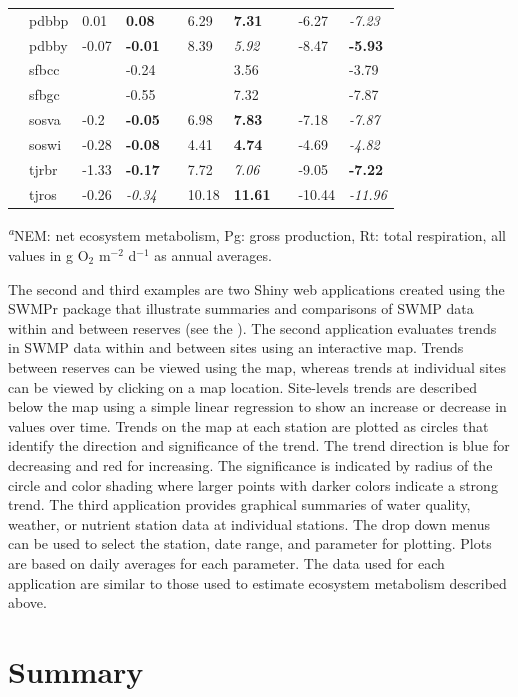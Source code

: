 \documentclass[10pt,letterpaper]{article}\usepackage[]{graphicx}\usepackage[]{color}
\begin{document}
\begin{table}[!tbp]
{\begin{center}
\begin{tabular}{lllcllcll}
~~pdbbp&0.01&{\bf 0.08}&&6.29&{\bf 7.31}&&-6.27&{\it -7.23}\tabularnewline
~~pdbby&-0.07&{\bf -0.01}&&8.39&{\it 5.92}&&-8.47&{\bf -5.93}\tabularnewline
~~sfbcc&&-0.24&&&3.56&&&-3.79\tabularnewline
~~sfbgc&&-0.55&&&7.32&&&-7.87\tabularnewline
~~sosva&-0.2&{\bf -0.05}&&6.98&{\bf 7.83}&&-7.18&{\it -7.87}\tabularnewline
~~soswi&-0.28&{\bf -0.08}&&4.41&{\bf 4.74}&&-4.69&{\it -4.82}\tabularnewline
~~tjrbr&-1.33&{\bf -0.17}&&7.72&{\it 7.06}&&-9.05&{\bf -7.22}\tabularnewline
~~tjros&-0.26&{\it -0.34}&&10.18&{\bf 11.61}&&-10.44&{\it -11.96}\tabularnewline
\hline
\end{tabular}\end{center}}

\footnotesize{\textsuperscript{{\it a}}NEM: net ecosystem metabolism, Pg: gross production, Rt: total respiration, all values in g O$_2$ m$^{-2}$ d$^{-1}$ as annual averages.}\end{table}


The second and third examples are two Shiny web applications \cite{Chang15} created using the SWMPr package that illustrate summaries and comparisons of \ac{SWMP} data within and between reserves (see the ).  The second application evaluates trends in \ac{SWMP} data within and between sites using an interactive map.  Trends between reserves can be viewed using the map, whereas trends at individual sites can be viewed by clicking on a map location.  Site-levels trends are described below the map using a simple linear regression to show an increase or decrease in values over time.  Trends on the map at each station are plotted as circles that identify the direction and significance of the trend.  The trend direction is blue for decreasing and red for increasing.  The significance is indicated by radius of the circle and color shading where larger points with darker colors indicate a strong trend.  The third application provides graphical summaries of water quality, weather, or nutrient station data at individual stations. The drop down menus can be used to select the station, date range, and parameter for plotting. Plots are based on daily averages for each parameter.  The data used for each application are similar to those used to estimate ecosystem metabolism described above.  

\section*{Summary}
\end{document}
